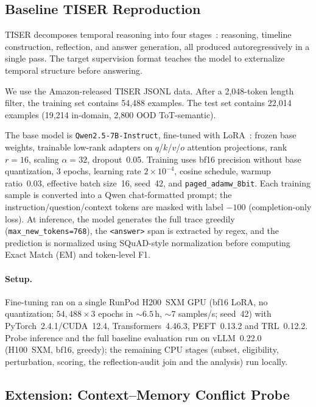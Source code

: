 \documentclass[conference]{IEEEtran}
\begin{document}
\subsection{Baseline TISER Reproduction}

TISER decomposes temporal reasoning into four stages~\cite{bazaga2025tiser}: reasoning, timeline construction, reflection, and answer generation, all produced autoregressively in a single pass. The target supervision format teaches the model to externalize temporal structure before answering.

We use the Amazon-released TISER JSONL data. After a 2,048-token length filter, the training set contains 54,488 examples. The test set contains 22,014 examples (19,214 in-domain, 2,800 OOD ToT-semantic).

The base model is \texttt{Qwen2.5-7B-Instruct}, fine-tuned with LoRA~\cite{hu2022lora}: frozen base weights, trainable low-rank adapters on $q$/$k$/$v$/$o$ attention projections, rank $r{=}16$, scaling $\alpha{=}32$, dropout~0.05. Training uses bf16 precision without base quantization, 3 epochs, learning rate $2{\times}10^{-4}$, cosine schedule, warmup ratio~0.03, effective batch size~16, seed~42, and \texttt{paged\_adamw\_8bit}. Each training sample is converted into a Qwen chat-formatted prompt; the instruction/question/context tokens are masked with label $-100$ (completion-only loss). At inference, the model generates the full trace greedily (\texttt{max\_new\_tokens=768}), the \texttt{<answer>} span is extracted by regex, and the prediction is normalized using SQuAD-style normalization before computing Exact Match (EM) and token-level F1.

\paragraph{Setup.}
Fine-tuning ran on a single RunPod H200~SXM GPU (bf16 LoRA, no quantization; $54{,}488{\times}3$ epochs in ${\sim}6.5$\,h, ${\sim}7$ samples/s; seed~42) with PyTorch~2.4.1/CUDA~12.4, Transformers~4.46.3, PEFT~0.13.2 and TRL~0.12.2. Probe inference and the full baseline evaluation run on vLLM~0.22.0 (H100~SXM, bf16, greedy); the remaining CPU stages (subset, eligibility, perturbation, scoring, the reflection-audit join and the analysis) run locally.

\subsection{Extension: Context--Memory Conflict Probe}
\end{document}
